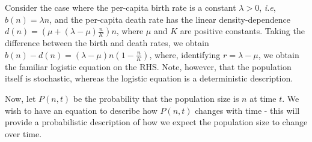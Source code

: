 \begin{example}\label{ex_1D_stoch_logistic}
Consider the case where the per-capita birth rate is a constant $\lambda > 0$, \emph{i.e}, $b(n) = \lambda n$, and the per-capita death rate has the linear density-dependence $d(n) = \left(\mu + (\lambda-\mu)\frac{n}{K}\right)n$, where $\mu$ and $K$ are positive constants. Taking the difference between the birth and death rates, we obtain $b(n) - d(n) = (\lambda - \mu)n\left(1-\frac{n}{K}\right)$, where, identifying $r=\lambda-\mu$, we obtain the familiar logistic equation on the RHS. Note, however, that the population itself is stochastic, whereas the logistic equation is a deterministic description.
\end{example}
Now, let $P(n,t)$ be the probability that the population size is $n$ at time $t$. We wish to have an equation to describe how $P(n,t)$ changes with time - this will provide a probabilistic description of how we expect the population size to change over time.

